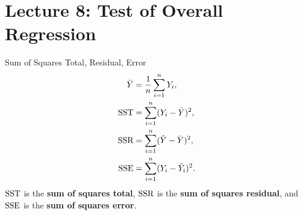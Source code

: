 \section{Lecture 8: Test of Overall Regression}
\begin{Definition}{Sum of Squares Total, Residual, Error}{}
    \begin{align*}
        \bar{Y}
             & =\frac{1}{n}\sum_{i=1}^{n}Y_i,      \\
        \text{SST} & =\sum_{i=1}^{n}(Y_i-\bar{Y})^2,     \\
        \text{SSR} & =\sum_{i=1}^{n}(\hat{Y}-\bar{Y})^2, \\
        \text{SSE} & =\sum_{i=1}^{n}(Y_i-\hat{Y}_i)^2.
    \end{align*}
    $ \text{SST} $ is the \textbf{sum of squares total},
    $ \text{SSR} $ is the \textbf{sum of squares residual},
    and $ \text{SSE} $ is the \textbf{sum of squares error}.
\end{Definition}
